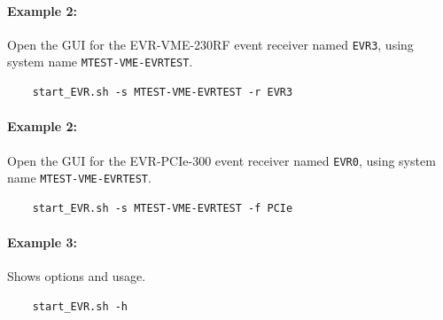\documentclass[12pt,a4paper]{article}
\begin{document}
\paragraph{Example 2:} Open the GUI for the EVR-VME-230RF event receiver named \texttt{EVR3}, using system name \texttt{MTEST-VME-EVRTEST}.
\begin{verbatim}
	start_EVR.sh -s MTEST-VME-EVRTEST -r EVR3
\end{verbatim}

\paragraph{Example 2:} Open the GUI for the EVR-PCIe-300 event receiver named \texttt{EVR0}, using system name \texttt{MTEST-VME-EVRTEST}.
\begin{verbatim}
	start_EVR.sh -s MTEST-VME-EVRTEST -f PCIe
\end{verbatim}

\paragraph{Example 3:} Shows options and usage.
\begin{verbatim}
	start_EVR.sh -h
\end{verbatim}



\end{document}

